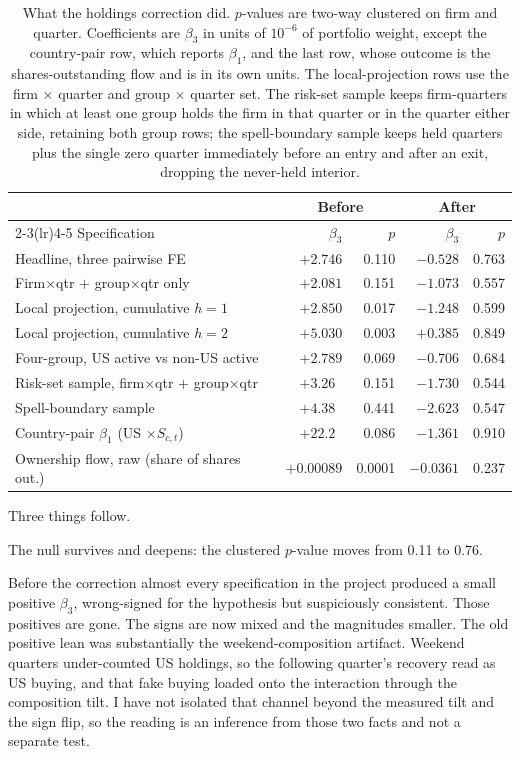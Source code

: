 \documentclass[11pt]{article}
\begin{document}
\begin{table}[H]
\centering
\small
\caption{What the holdings correction did. $p$-values are two-way clustered on
firm and quarter. Coefficients are $\beta_3$ in units of $10^{-6}$ of
portfolio weight, except the country-pair row, which reports $\beta_1$, and
the last row, whose outcome is the shares-outstanding flow and is in its own
units. The local-projection rows use the firm $\times$ quarter and group
$\times$ quarter set. The risk-set sample keeps firm-quarters in which at least
one group holds the firm in that quarter or in the quarter either side,
retaining both group rows; the spell-boundary sample keeps held quarters plus
the single zero quarter immediately before an entry and after an exit, dropping
the never-held interior.}
\label{tab:prepost}
\begin{tabular}{lrrrr}
\toprule
 & \multicolumn{2}{c}{Before} & \multicolumn{2}{c}{After} \\
\cmidrule(lr){2-3}\cmidrule(lr){4-5}
Specification & $\beta_3$ & $p$ & $\beta_3$ & $p$ \\
\midrule
Headline, three pairwise FE      & $+2.746$ & 0.110 & $-0.528$ & 0.763 \\
Firm$\times$qtr $+$ group$\times$qtr only & $+2.081$ & 0.151 & $-1.073$ & 0.557 \\
Local projection, cumulative $h=1$ & $+2.850$ & 0.017 & $-1.248$ & 0.599 \\
Local projection, cumulative $h=2$ & $+5.030$ & 0.003 & $+0.385$ & 0.849 \\
Four-group, US active vs non-US active & $+2.789$ & 0.069 & $-0.706$ & 0.684 \\
Risk-set sample, firm$\times$qtr $+$ group$\times$qtr & $+3.26\phantom{0}$ & 0.151 & $-1.730$ & 0.544 \\
Spell-boundary sample            & $+4.38\phantom{0}$ & 0.441 & $-2.623$ & 0.547 \\
Country-pair $\beta_1$ (US $\times S_{c,t}$) & $+22.2\phantom{0}$ & 0.086 & $-1.361$ & 0.910 \\
Ownership flow, raw (share of shares out.) & $+0.00089$ & 0.0001 & $-0.0361$ & 0.237 \\
\bottomrule
\end{tabular}
\end{table}

Three things follow.

The null survives and deepens: the clustered $p$-value moves from 0.11 to 0.76.

Before the correction almost every specification in the project produced a
small positive $\beta_3$, wrong-signed for the hypothesis but suspiciously
consistent. Those positives are gone. The signs are now mixed and the
magnitudes smaller. The old positive lean was substantially the
weekend-composition artifact. Weekend quarters under-counted US holdings, so
the following quarter's recovery read as US buying, and that fake buying loaded
onto the interaction through the composition tilt. I have not isolated that
channel beyond the measured tilt and the sign flip, so the reading is an
inference from those two facts and not a separate test.
\end{document}
